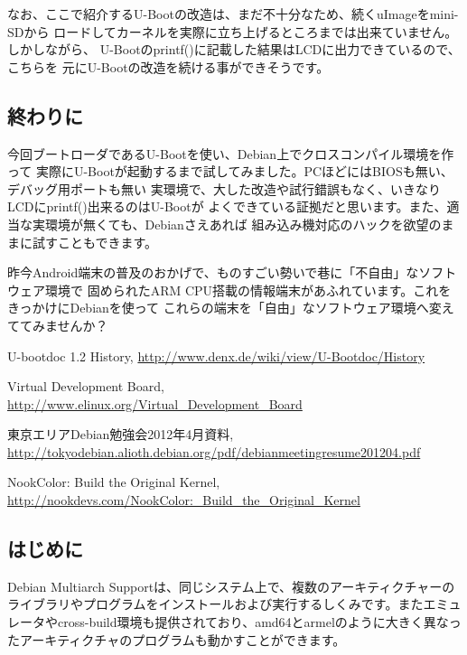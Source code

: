 \documentclass[mingoth,a4paper]{jsarticle}
\begin{document}
なお、ここで紹介するU-Bootの改造は、まだ不十分なため、続くuImageをmini-SDから
ロードしてカーネルを実際に立ち上げるところまでは出来ていません。しかしながら、
U-Bootのprintf()に記載した結果はLCDに出力できているので、こちらを
元にU-Bootの改造を続ける事ができそうです。

\subsection{終わりに}

今回ブートローダであるU-Bootを使い、Debian上でクロスコンパイル環境を作って
実際にU-Bootが起動するまで試してみました。PCほどにはBIOSも無い、デバッグ用ポートも無い
実環境で、大した改造や試行錯誤もなく、いきなりLCDにprintf()出来るのはU-Bootが
よくできている証拠だと思います。また、適当な実環境が無くても、Debianさえあれば
組み込み機対応のハックを欲望のままに試すこともできます。

昨今Android端末の普及のおかげで、ものすごい勢いで巷に「不自由」なソフトウェア環境で
固められたARM CPU搭載の情報端末があふれています。これをきっかけにDebianを使って
これらの端末を「自由」なソフトウェア環境へ変えててみませんか？

\begin{thebibliography}{0}

U-bootdoc 1.2 History,
\url{http://www.denx.de/wiki/view/U-Bootdoc/History}

Virtual Development Board,
\url{http://www.elinux.org/Virtual_Development_Board}

東京エリアDebian勉強会2012年4月資料,
\url{http://tokyodebian.alioth.debian.org/pdf/debianmeetingresume201204.pdf}

NookColor: Build the Original Kernel,
 \url{http://nookdevs.com/NookColor:_Build_the_Original_Kernel}

\end{thebibliography}

\label{sec:Multiarch}

\subsection{はじめに}
Debian Multiarch Supportは、同じシステム上で、複数のアーキティクチャーのライブラリやプログラムをインストールおよび実行するしくみです。またエミュレータやcross-build環境も提供されており、amd64とarmelのように大きく異なったアーキティクチャのプログラムも動かすことができます。
\end{document}
